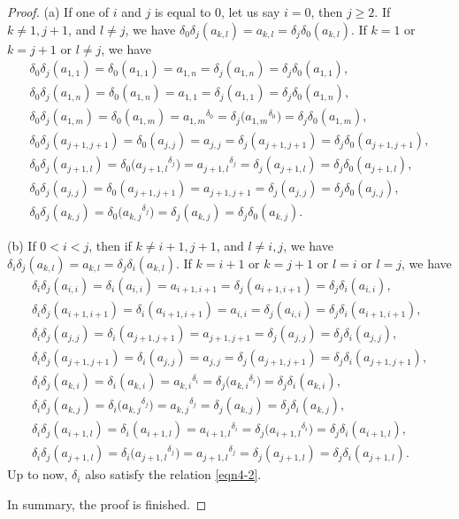 \documentclass[10pt,a4paper]{amsart}
\numberwithin{equation}{section}
\def\lrb#1{\left(#1\right)}
\def\d{\delta}
\begin{document}
\begin{proof}
(a) If one of $i$ and $j$ is equal to $0$, let us say $i=0$, then $j\ge 2$.
If $ k \neq 1, j+1$, and $ l \neq j$, we have
$ \d_0\d_j\lrb{a_{k,l}}=a_{k,l}=\d_j\d_0\lrb{a_{k,l}}$.
If $ k = 1$ or $k=j+1$ or $l \neq j$, we have
\begin{gather*}
 \d_0\d_j\lrb{a_{1,1}}=\d_0\lrb{a_{1,1}}=a_{1,n}=\d_j\lrb{a_{1,n}}=\d_j\d_0\lrb{a_{1,1}},\\
 \d_0\d_j\lrb{a_{1,n}}=\d_0\lrb{a_{1,n}}=a_{1,1}=\d_j\lrb{a_{1,1}}=\d_j\d_0\lrb{a_{1,n}},\\
 \d_0\d_j\lrb{a_{1,m}}=\d_0\lrb{a_{1,m}}={a_{1,m}}^{\d_{0}}
=\d_j\bigl({a_{1,m}}^{\d_{0}}\bigr)=\d_j\d_0\lrb{a_{1,m}},\\
 \d_0\d_j\lrb{a_{j+1,j+1}}=\d_0\lrb{a_{j,j}}=a_{j,j}=\d_j\lrb{a_{j+1,j+1}}=\d_j\d_0 \lrb{a_{j+1,j+1}},\\
 \d_0\d_j\lrb{a_{j+1,l}}=\d_0\bigl({a_{j+1,l}}^{\d_{j}}\bigr)
={a_{j+1,l}}^{\d_{j}}=\d_j\lrb{a_{j+1,l}}=\d_j\d_0\lrb{a_{j+1,l}},\\
 \d_0\d_j\lrb{a_{j,j}}=\d_0\lrb{a_{j+1,j+1}}=a_{j+1,j+1}=\d_j\lrb{a_{j,j}} =\d_j\d_0\lrb{a_{j,j}},\\
 \d_0\d_j\lrb{a_{k,j}}=\d_0\bigl({a_{k,j}}^{\d_{j}}\bigr)
=\d_j\lrb{a_{k,j}}=\d_j\d_0\lrb{a_{k,j}}.
\end{gather*}

(b) If $0<i <j$, then if $ k \neq i+1, j+1$, and $l \neq i, j$, we have
$\d_i\d_j\lrb{a_{k,l}}=a_{k,l}=\d_j\d_i\lrb{a_{k,l}}$.
If $k=i+1$ or $k=j+1$ or $l=i$ or $l=j$, we have
\begin{gather*}
 \d_i\d_j\lrb{a_{i,i}}=\d_i\lrb{a_{i,i}}=a_{i+1,i+1}=\d_j\lrb{a_{i+1,i+1}} =\d_j\d_i\lrb{a_{i,i}},\\
 \d_i\d_j\lrb{a_{i+1,i+1}}=\d_i\lrb{a_{i+1,i+1}}=a_{i,i}=\d_j\lrb{a_{i,i}} =\d_j\d_i\lrb{a_{i+1,i+1}},\\
 \d_i\d_j\lrb{a_{j,j}}=\d_i\lrb{a_{j+1,j+1}}=a_{j+1,j+1}=\d_j\lrb{a_{j,j}} =\d_j\d_i\lrb{a_{j,j}},\\
 \d_i\d_j\lrb{a_{j+1,j+1}}=\d_i\lrb{a_{j,j}}=a_{j,j}=\d_j\lrb{a_{j+1,j+1}} =\d_j\d_i\lrb{a_{j+1,j+1}},\\
 \d_i\d_j\lrb{a_{k,i}}=\d_i\lrb{a_{k,i}}={a_{k,i}}^{\d_{i}}
=\d_j\bigl({a_{k,i}}^{\d_{i}}\bigr)=\d_j\d_i\lrb{a_{k,i}},\\
 \d_i\d_j\lrb{a_{k,j}}=\d_i\bigl({a_{k,j}}^{\d_{j}} \bigr)
={a_{k,j}}^{\d_{j}}=\d_j\lrb{a_{k,j}} =\d_j\d_i\lrb{a_{k,j}},\\
 \d_i\d_j\lrb{a_{i+1,l}}=\d_i\lrb{a_{i+1,l}}={a_{i+1,l}}^{\d_{i}}
=\d_j\bigl({a_{i+1,l}}^{\d_{i}}\bigr)=\d_j\d_i\lrb{a_{i+1,l}},\\
 \d_i\d_j\lrb{a_{j+1,l}}=\d_i\bigl({a_{j+1,l}}^{\d_{j}}\bigr)={a_{j+1,l}}^{\d_{j}}
=\d_j\lrb{a_{j+1,l}}=\d_j\d_i\lrb{a_{j+1,l}}.
\end{gather*}
Up to now, $\d_i$ also satisfy the relation \eqref{eqn4-2}.

In summary, the proof is finished.
\end{proof}
\end{document}
